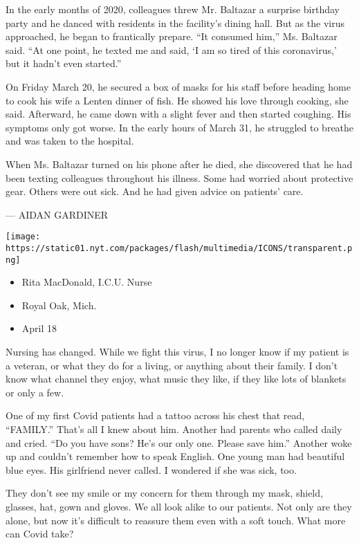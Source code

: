 In the early months of 2020, colleagues threw Mr. Baltazar a surprise
birthday party and he danced with residents in the facility's dining
hall. But as the virus approached, he began to frantically prepare. ``It
consumed him,'' Ms. Baltazar said. ``At one point, he texted me and
said, `I am so tired of this coronavirus,' but it hadn't even started.''

On Friday March 20, he secured a box of masks for his staff before
heading home to cook his wife a Lenten dinner of fish. He showed his
love through cooking, she said. Afterward, he came down with a slight
fever and then started coughing. His symptoms only got worse. In the
early hours of March 31, he struggled to breathe and was taken to the
hospital.

When Ms. Baltazar turned on his phone after he died, she discovered that
he had been texting colleagues throughout his illness. Some had worried
about protective gear. Others were out sick. And he had given advice on
patients' care.

--- AIDAN GARDINER

\texttt{[image: https://static01.nyt.com/packages/flash/multimedia/ICONS/transparent.png]}

\begin{itemize}
\tightlist
\item
  Rita MacDonald, I.C.U. Nurse
\item
  Royal Oak, Mich.
\item
  April 18
\end{itemize}

Nursing has changed. While we fight this virus, I no longer know if my
patient is a veteran, or what they do for a living, or anything about
their family. I don't know what channel they enjoy, what music they
like, if they like lots of blankets or only a few.

One of my first Covid patients had a tattoo across his chest that read,
``FAMILY.'' That's all I knew about him. Another had parents who called
daily and cried. ``Do you have sons? He's our only one. Please save
him.'' Another woke up and couldn't remember how to speak English. One
young man had beautiful blue eyes. His girlfriend never called. I
wondered if she was sick, too.

They don't see my smile or my concern for them through my mask, shield,
glasses, hat, gown and gloves. We all look alike to our patients. Not
only are they alone, but now it's difficult to reassure them even with a
soft touch. What more can Covid take?

